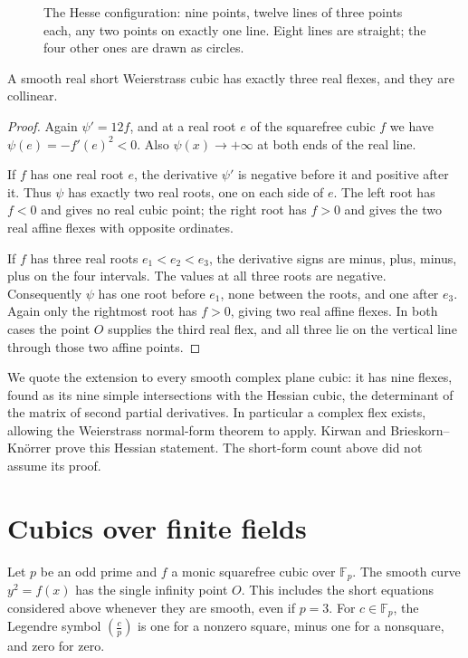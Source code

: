 \begin{figure}[ht]
\centering
{}
\caption{The Hesse configuration: nine points, twelve lines of three points each, any two points on exactly one line. Eight lines are straight; the four
other ones are drawn as circles.}
\label{geometry:fig:hesse}
\end{figure}

\begin{theorem}\label{geometry:thm:realflexes}
A smooth real short Weierstrass cubic has exactly three real flexes, and they are collinear.
\end{theorem}
\begin{proof}
Again $\psi'=12f$, and at a real root $e$ of the squarefree cubic $f$ we have $\psi(e)=-f'(e)^2<0$. Also $\psi(x)\to+\infty$ at both ends of the real line.

If $f$ has one real root $e$, the derivative $\psi'$ is negative before it and positive after it. Thus $\psi$ has exactly two real roots, one on each side of $e$. The left root has $f<0$ and gives no real cubic point; the right root has $f>0$ and gives the two real affine flexes with opposite ordinates.

If $f$ has three real roots $e_1<e_2<e_3$, the derivative signs are minus, plus, minus, plus on the four intervals. The values at all three roots are negative. Consequently $\psi$ has one root before $e_1$, none between the roots, and one after $e_3$. Again only the rightmost root has $f>0$, giving two real affine flexes. In both cases the point $O$ supplies the third real flex, and all three lie on the vertical line through those two affine points.
\end{proof}

\begin{remark}
We quote the extension to every smooth complex plane cubic: it has nine flexes, found as its nine simple intersections with the Hessian cubic, the determinant of the matrix of second partial derivatives. In particular a complex flex exists, allowing the Weierstrass normal-form theorem to apply. Kirwan and Brieskorn--Kn\"orrer prove this Hessian statement. The short-form count above did not assume its proof.
\end{remark}

\section{Cubics over finite fields}

Let $p$ be an odd prime and $f$ a monic squarefree cubic over $\mathbb F_p$. The smooth curve $y^2=f(x)$ has the single infinity point $O$. This includes the short equations considered above whenever they are smooth, even if $p=3$. For $c\in\mathbb F_p$, the Legendre symbol $\left(\frac cp\right)$ is one for a nonzero square, minus one for a nonsquare, and zero for zero.

